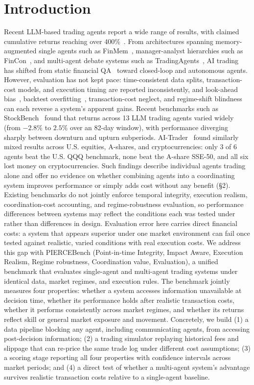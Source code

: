 \documentclass{article}
\begin{document}
\section{Introduction}
Recent LLM-based trading agents report a wide range of results, with claimed cumulative returns reaching over 400\%~\cite{li2025hedgeagents}. From architectures spanning memory-augmented single agents such as FinMem~\cite{yu2023finmem}, manager-analyst hierarchies such as FinCon~\cite{yu2024fincon}, and multi-agent debate systems such as TradingAgents~\cite{xiao2024ta}, AI trading has shifted from static financial QA~\cite{chen2021finqa} toward closed-loop and autonomous agents. However, evaluation has not kept pace: time-consistent data splits, transaction-cost models, and execution timing are reported inconsistently, and look-ahead bias~\cite{lopezdeprado2018}, backtest overfitting~\cite{bailey2014}, transaction-cost neglect, and regime-shift blindness can each reverse a system's apparent gains. Recent benchmarks such as
StockBench~\cite{chen2025stockbench} found that returns across 13 LLM trading agents varied widely (from $-2.8\%$ to $2.5\%$ over an 82-day window), with performance diverging sharply between downturn and upturn subperiods. AI-Trader~\cite{fan2025aitrader} found similarly mixed results across U.S. equities, A-shares, and cryptocurrencies: only 3 of 6 agents beat the U.S. QQQ benchmark, none beat the A-share SSE-50, and all six lost money on cryptocurrencies.
Such findings describe individual agents trading alone and offer no evidence on whether combining agents into a coordinating system improves performance or simply adds cost without any benefit (\S2). Existing benchmarks do not jointly enforce temporal integrity, execution realism, coordination-cost accounting, and regime-robustness evaluation, so performance differences between systems may reflect the conditions each was tested under rather than differences in design. Evaluation error here carries direct financial costs: a system that appears superior under one market environment can fail once tested against realistic, varied conditions with real execution costs.
We address this gap with PIERCEBench (Point-in-time Integrity, Impact Aware, Execution Realism, Regime robustness, Coordination value, Evaluation), a unified benchmark that evaluates single-agent and multi-agent trading systems under identical data, market regimes, and execution rules. The benchmark jointly measures four properties: whether a system accesses information unavailable at decision time, whether its performance holds after realistic transaction costs, whether it performs consistently across market regimes, and whether its returns reflect skill or general market exposure and movement. Concretely, we build (1) a data pipeline blocking any agent, including communicating agents, from accessing post-decision information; (2) a trading simulator replaying historical fees and slippage that can re-price the same trade log under different cost assumptions; (3) a scoring stage reporting all four properties with confidence intervals across market periods; and (4) a direct test of whether a multi-agent system's advantage survives realistic transaction costs relative to a single-agent baseline.
\end{document}
